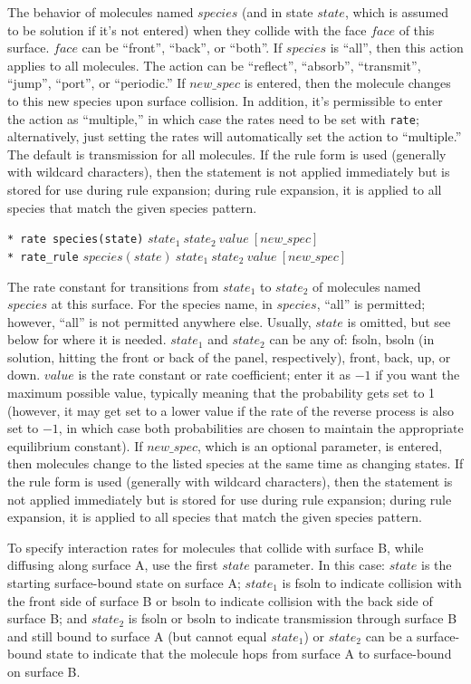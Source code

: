 \documentclass {scrbook}
\newcommand {\ttt} {\texttt}
\begin{document}
\begin{description}
The behavior of molecules named $species$ (and in state $state$, which is assumed to be solution if it's not entered) when they collide with the face $face$ of this surface. $face$ can be ``front'', ``back'', or ``both''. If $species$ is ``all'', then this action applies to all molecules. The action can be ``reflect'', ``absorb'', ``transmit'', ``jump'', ``port'', or ``periodic.'' If $new\_spec$ is entered, then the molecule changes to this new species upon surface collision. In addition, it's permissible to enter the action as ``multiple,'' in which case the rates need to be set with \ttt{rate}; alternatively, just setting the rates will automatically set the action to ``multiple.'' The default is transmission for all molecules. If the rule form is used (generally with wildcard characters), then the statement is not applied immediately but is stored for use during rule expansion; during rule expansion, it is applied to all species that match the given species pattern.

\item{\ttt{* rate species(state)} $state_1\ state_2\ value\ [new\_spec]$\\
\ttt{* rate\_rule} $species(state)\ state_1\ state_2\ value\ [new\_spec]$}

The rate constant for transitions from $state_1$ to $state_2$ of molecules named $species$ at this surface. For the species name, in $species$, ``all'' is permitted; however, ``all'' is not permitted anywhere else. Usually, $state$ is omitted, but see below for where it is needed. $state_1$ and $state_2$ can be any of: fsoln, bsoln (in solution, hitting the front or back of the panel, respectively), front, back, up, or down. $value$ is the rate constant or rate coefficient; enter it as $-1$ if you want the maximum possible value, typically meaning that the probability gets set to 1 (however, it may get set to a lower value if the rate of the reverse process is also set to $-1$, in which case both probabilities are chosen to maintain the appropriate equilibrium constant). If $new\_spec$, which is an optional parameter, is entered, then molecules change to the listed species at the same time as changing states. If the rule form is used (generally with wildcard characters), then the statement is not applied immediately but is stored for use during rule expansion; during rule expansion, it is applied to all species that match the given species pattern.

To specify interaction rates for molecules that collide with surface B, while diffusing along surface A, use the first $state$ parameter. In this case: $state$ is the starting surface-bound state on surface A; $state_1$ is fsoln to indicate collision with the front side of surface B or bsoln to indicate collision with the back side of surface B; and $state_2$ is fsoln or bsoln to indicate transmission through surface B and still bound to surface A (but cannot equal $state_1$) or $state_2$ can be a surface-bound state to indicate that the molecule hops from surface A to surface-bound on surface B.


\end{description}
\end{document}
